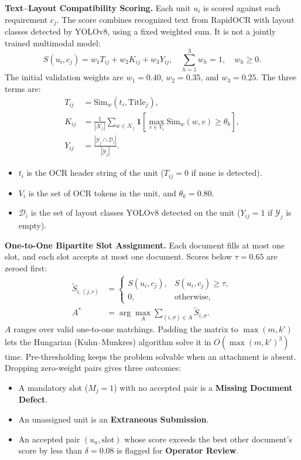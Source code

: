 \textbf{Text--Layout Compatibility Scoring.} Each unit $u_i$ is scored against each requirement $c_j$. The score combines recognized text from RapidOCR with layout classes detected by YOLOv8, using a fixed weighted sum. It is not a jointly trained multimodal model:
\begin{equation}
\label{eq:compat_score}
S(u_i, c_j) = w_1 T_{ij} + w_2 K_{ij} + w_3 Y_{ij}, \quad \sum_{h=1}^{3} w_h = 1, \quad w_h \ge 0.
\end{equation}
The initial validation weights are $w_1 = 0.40$, $w_2 = 0.35$, and $w_3 = 0.25$. The three terms are:
\begin{align}
\label{eq:compat_t}
T_{ij} &= \mathrm{Sim}_w(t_i, \mathrm{Title}_j), \\
\label{eq:compat_k}
K_{ij} &= \frac{1}{|\mathcal{K}_j|} \sum_{w \in \mathcal{K}_j} \mathbf1\!\left[\max_{v \in V_i} \mathrm{Sim}_w(w, v) \ge \theta_k\right], \\
\label{eq:compat_y}
Y_{ij} &= \frac{|\mathcal{Y}_j \cap \mathcal{D}_i|}{|\mathcal{Y}_j|}.
\end{align}
\begin{itemize}
    \item $t_i$ is the OCR header string of the unit ($T_{ij} = 0$ if none is detected).
    \item $V_i$ is the set of OCR tokens in the unit, and $\theta_k = 0.80$.
    \item $\mathcal{D}_i$ is the set of layout classes YOLOv8 detected on the unit ($Y_{ij} = 1$ if $\mathcal{Y}_j$ is empty).
\end{itemize}

\textbf{One-to-One Bipartite Slot Assignment.} Each document fills at most one slot, and each slot accepts at most one document. Scores below $\tau = 0.65$ are zeroed first:
\begin{align}
\label{eq:threshold_score}
\tilde{S}_{i,(j,r)} &= \begin{cases}
S(u_i, c_j), & S(u_i, c_j) \ge \tau, \\
0, & \text{otherwise,}
\end{cases} \\
\label{eq:hungarian_opt}
A^* &= \arg\max_{A} \sum_{(i, \sigma) \in A} \tilde{S}_{i, \sigma}.
\end{align}
$A$ ranges over valid one-to-one matchings. Padding the matrix to $\max(m, k')$ lets the Hungarian (Kuhn--Munkres) algorithm solve it in $O(\max(m, k')^3)$ time. Pre-thresholding keeps the problem solvable when an attachment is absent. Dropping zero-weight pairs gives three outcomes:
\begin{itemize}
    \item A mandatory slot ($M_j = 1$) with no accepted pair is a \textbf{Missing Document Defect}.
    \item An unassigned unit is an \textbf{Extraneous Submission}.
    \item An accepted pair $(u_a, \text{slot})$ whose score exceeds the best other document's score by less than $\delta = 0.08$ is flagged for \textbf{Operator Review}.
\end{itemize}


